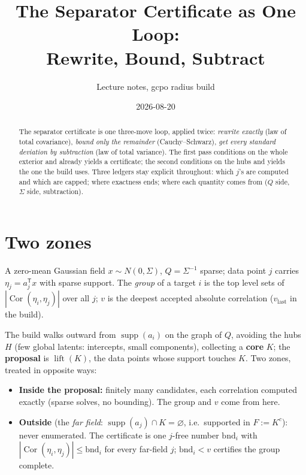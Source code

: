 \documentclass[11pt]{article}
\title{The Separator Certificate as One Loop:\\
Rewrite, Bound, Subtract}
\author{Lecture notes, gcpo radius build}
\date{2026-08-20}
\theoremstyle{remark}
\newcommand{\Cor}{\operatorname{Cor}}
\newcommand{\tr}{^{\mathsf T}}
\newcommand{\supp}{\operatorname{supp}}
\begin{document}
\maketitle

\begin{abstract}
\noindent
The separator certificate is one three-move loop, applied twice:
\emph{rewrite exactly} (law of total covariance), \emph{bound only the
remainder} (Cauchy--Schwarz), \emph{get every standard deviation by
subtraction} (law of total variance).  The first pass conditions on the
whole exterior and already yields a certificate; the second conditions
on the hubs and yields the one the build uses.  Three ledgers stay
explicit throughout: which $j$'s are computed and which are capped;
where exactness ends; where each quantity comes from ($Q$ side,
$\Sigma$ side, subtraction).
\end{abstract}

\section{Two zones}\label{sec:zones}

A zero-mean Gaussian field $x \sim N(0, \Sigma)$, $Q = \Sigma^{-1}$
sparse; data point $j$ carries $\eta_j = a_j\tr x$ with sparse support.
The \emph{group} of a target $i$ is the top level sets of
$|\Cor(\eta_i,\eta_j)|$ over all $j$; $v$ is the deepest accepted
absolute correlation ($v_{\mathrm{last}}$ in the build).

The build walks outward from $\supp(a_i)$ on the graph of $Q$, avoiding
the hubs $H$ (few global latents: intercepts, small components),
collecting a \textbf{core} $K$; the \textbf{proposal} is
$\operatorname{lift}(K)$, the data points whose support touches $K$.
Two zones, treated in opposite ways:

\begin{itemize}
\item \textbf{Inside the proposal:} finitely many candidates, each
  correlation computed exactly (sparse solves, no bounding).  The group
  and $v$ come from here.
\item \textbf{Outside} (the \emph{far field}:
  $\supp(a_j) \cap K = \varnothing$, i.e.\ supported in $F := K^c$):
  never enumerated.  The certificate is one $j$-free number
  $\mathrm{bnd}_i$ with $|\Cor(\eta_i,\eta_j)| \le \mathrm{bnd}_i$ for
  every far-field $j$; $\mathrm{bnd}_i < v$ certifies the group
  complete.
\end{itemize}
\end{document}
